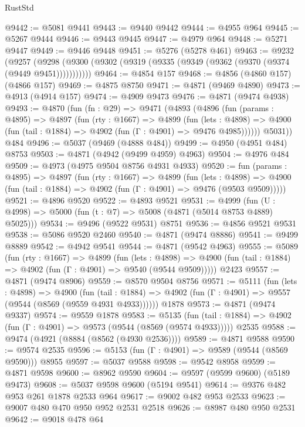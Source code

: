 \begin{lexlean}{RustStd}
\begin{coremodule}
{\begin{coremodule}
{{{{{{{{{{{{{{{{{{{{{{{{{{{{{@9442 := @5081 @9441
@9443 := @9440 @9442
@9444 := @4955 @964
@9445 := @5267 @9444
@9446 := @9443 @9445
@9447 := @4979 @964
@9448 := @5271 @9447
@9449 := @9446 @9448
@9451 := @5276 (@5278 @461)
@9463 := @9232
    (@9257 (@9298 (@9300 (@9302 (@9319 (@9335 (@9349 (@9362 (@9370 (@9374 (@9449 @9451)))))))))))
@9464 := @4854 @157
@9468 := @4856 (@4860 @157) (@4866 @157)
@9469 := @4875 @8750
@9471 := @4871 (@9469 @4890)
@9473 := @4913 (@4914 @157)
@9474 := @4909 @9473
@9476 := @4871 (@9474 @4938)
@9493 := @4870
    (fun (fn : @29) =>
    @9471
      (@4893
        (@4896
          (fun (params : @4895) =>
          @4897
            (fun (rty : @1667) =>
            @4899
              (fun (lets : @4898) =>
              @4900 (fun (tail : @1884) => @4902 (fun (Γ : @4901) => @9476 @4985))))))
        @5031))
    @484
@9496 := @5037 (@9469 (@4888 @484))
@9499 := @4950 (@4951 @484) @8753
@9503 := @4871 (@4942 (@9499 @4959) @4963)
@9504 := @4976 @484
@9509 := @4973 (@4975 @9504 @8756 @4931 @4933)
@9520 := fun (params : @4895) =>
  @4897
    (fun (rty : @1667) =>
    @4899
      (fun (lets : @4898) =>
      @4900 (fun (tail : @1884) => @4902 (fun (Γ : @4901) => @9476 (@9503 @9509)))))
@9521 := @4896 @9520
@9522 := @4893 @9521
@9531 := @4999 (fun (U : @4998) => @5000 (fun (t : @7) => @5008 (@4871 (@5014 @8753 @4889) @5025)))
@9534 := @9496 (@9522 @9531) @8751
@9536 := @4856 @9521 @9531
@9538 := @5086 @9520 @2460
@9540 := @4871 (@9474 @8886)
@9541 := @9499 @8889
@9542 := @4942 @9541
@9544 := @4871 (@9542 @4963)
@9555 := @5089
    (fun (rty : @1667) =>
    @4899
      (fun (lets : @4898) =>
      @4900 (fun (tail : @1884) => @4902 (fun (Γ : @4901) => @9540 (@9544 @9509)))))
    @2423
@9557 := @4871 (@9474 @8906)
@9559 := @8570 @9504 @8756
@9571 := @5111
    (fun (lets : @4898) =>
    @4900
      (fun (tail : @1884) => @4902 (fun (Γ : @4901) => @9557 (@9544 (@8569 (@9559 @4931 @4933))))))
    @1878
@9573 := @4871 (@9474 @9337)
@9574 := @9559 @1878
@9583 := @5135
    (fun (tail : @1884) => @4902 (fun (Γ : @4901) => @9573 (@9544 (@8569 (@9574 @4933)))))
    @2535
@9588 := @9474 (@4921 (@8884 (@8562 (@4930 @2536))))
@9589 := @4871 @9588
@9590 := @9574 @2535
@9596 := @5153 (fun (Γ : @4901) => @9589 (@9544 (@8569 @9590))) @8955
@9597 := @5037 @9588
@9598 := @9542 @8958
@9599 := @4871 @9598
@9600 := @8962 @9590
@9604 := @9597 (@9599 @9600) (@5189 @9473)
@9608 := @5037 @9598 @9600 (@5194 @9541)
@9614 := @9376 @482 @953 @261 @1878 @2533 @964
@9617 := @9002 @482 @953 @2533
@9623 := @9007 @480 @470 @950 @952 @2531 @2518
@9626 := @8987 @480 @950 @2531
@9642 := @9018
    @478
    @64
}}}}}}}}}}}}}}}}}}}}}}}}}}}}}
\end{coremodule}}
\end{coremodule}
\end{lexlean}
